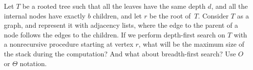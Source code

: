 Let $T$ be a rooted tree such that all the leaves have the same depth
$d$, and all the internal nodes have exactly $b$ children, and let $r$
be the root of~$T$.  Consider $T$ as a graph, and represent it with
adjacency lists, where the edge to the parent of a node follows the
edges to the children.  If we perform depth-first search on $T$ with a
nonrecursive procedure starting at vertex $r$, what will be the maximum
size of the stack during the computation?   And what about
breadth-first search? Use $O$ or $\Theta$  notation.
